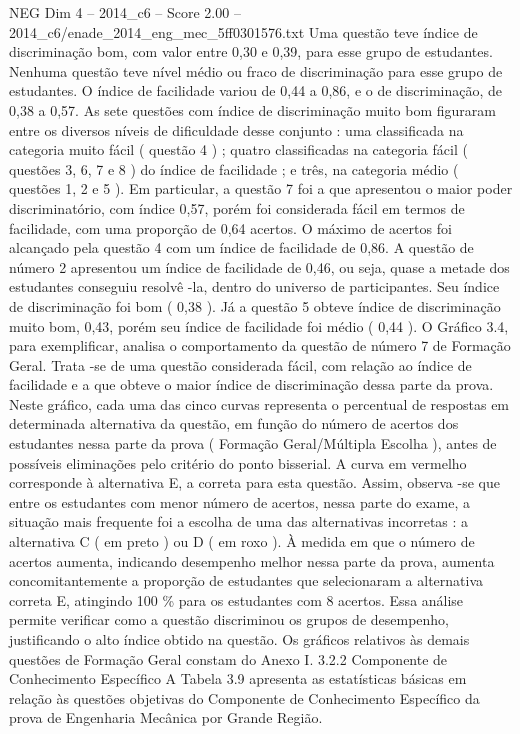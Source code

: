 \begin{textsample}{NEG Dim 4 – 2014\_c6 – Score 2.00 – 2014\_c6/enade\_2014\_eng\_mec\_5ff0301576.txt}
Uma questão teve índice de discriminação bom, com valor entre 0,30 e 0,39, para esse grupo de estudantes.
Nenhuma questão teve nível médio ou fraco de discriminação para esse grupo de estudantes.
O índice de facilidade variou de 0,44 a 0,86, e o de discriminação, de 0,38 a 0,57.
As sete questões com índice de discriminação muito bom figuraram entre os diversos níveis de dificuldade desse conjunto : uma classificada na categoria muito fácil ( questão 4 ) ; quatro classificadas na categoria fácil ( questões 3, 6, 7 e 8 ) do índice de facilidade ; e três, na categoria médio ( questões 1, 2 e 5 ).
Em particular, a questão 7 foi a que apresentou o maior poder discriminatório, com índice 0,57, porém foi considerada fácil em termos de facilidade, com uma proporção de 0,64 acertos.
O máximo de acertos foi alcançado pela questão 4 com um índice de facilidade de 0,86.
A questão de número 2 apresentou um índice de facilidade de 0,46, ou seja, quase a metade dos estudantes conseguiu resolvê -la, dentro do universo de participantes.
Seu índice de discriminação foi bom ( 0,38 ).
Já a questão 5 obteve índice de discriminação muito bom, 0,43, porém seu índice de facilidade foi médio ( 0,44 ).
O Gráfico 3.4, para exemplificar, analisa o comportamento da questão de número 7 de Formação Geral.
Trata -se de uma questão considerada fácil, com relação ao índice de facilidade e a que obteve o maior índice de discriminação dessa parte da prova.
Neste gráfico, cada uma das cinco curvas representa o percentual de respostas em determinada alternativa da questão, em função do número de acertos dos estudantes nessa parte da prova ( Formação Geral/Múltipla Escolha ), antes de possíveis eliminações pelo critério do ponto bisserial.
A curva em vermelho corresponde à alternativa E, a correta para esta questão.
Assim, observa -se que entre os estudantes com menor número de acertos, nessa parte do exame, a situação mais frequente foi a escolha de uma das alternativas incorretas : a alternativa C ( em preto ) ou D ( em roxo ).
À medida em que o número de acertos aumenta, indicando desempenho melhor nessa parte da prova, aumenta concomitantemente a proporção de estudantes que selecionaram a alternativa correta E, atingindo 100 \% para os estudantes com 8 acertos.
Essa análise permite verificar como a questão discriminou os grupos de desempenho, justificando o alto índice obtido na questão.
Os gráficos relativos às demais questões de Formação Geral constam do Anexo I. 3.2.2 Componente de Conhecimento Específico A Tabela 3.9 apresenta as estatísticas básicas em relação às questões objetivas do Componente de Conhecimento Específico da prova de Engenharia Mecânica por Grande Região.

\end{textsample}

